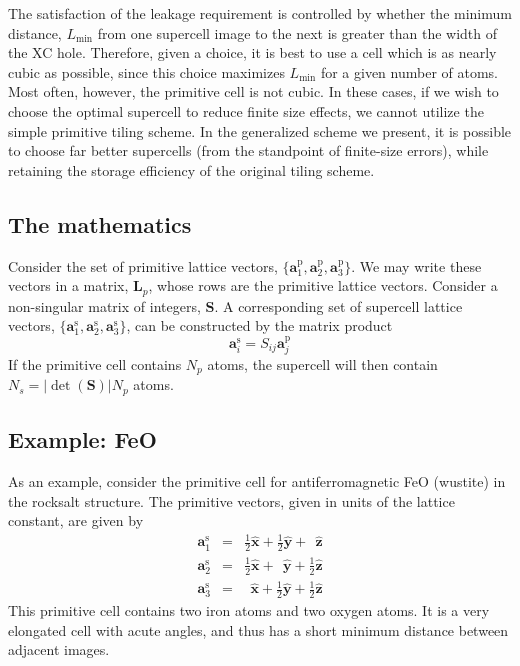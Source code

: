 The satisfaction of the leakage requirement is controlled by whether
the minimum distance, $L_{\text{min}}$ from one supercell image to the
next is greater than the width of the XC hole.  Therefore, given a
choice, it is best to use a cell which is as nearly cubic as possible,
since this choice maximizes $L_{\text{min}}$ for a given number of
atoms.  Most often, however, the primitive cell is not cubic.  In
these cases, if we wish to choose the optimal supercell to reduce
finite size effects, we cannot utilize the simple primitive tiling
scheme.  In the generalized scheme we present, it is possible to
choose far better supercells (from the standpoint of finite-size
errors), while retaining the storage efficiency of the original tiling
scheme.

\subsection{The mathematics}
\renewcommand{\vp}{\mathbf{a}^{\text{p}}}
\renewcommand{\vs}{\mathbf{a}^{\text{s}}} 
\renewcommand{\Smat}{\mathbf{S}}
Consider the set of primitive lattice vectors, $\{\vp_1, \vp_2,
\vp_3\}$.  We may write these vectors in a matrix, $\mathbf{L}_p$, whose
rows are the primitive lattice vectors.  Consider a non-singular
matrix of integers, $\Smat$.  A corresponding set of supercell lattice
vectors, $\{\vs_1, \vs_2, \vs_3\}$, can be constructed by the matrix
product 
\begin{equation}
\vs_i = S_{ij} \vp_j
\end{equation}
If the primitive cell contains $N_p$ atoms, the supercell will then
contain $N_s = |\det(\Smat)| N_p$ atoms.

\subsection{Example: FeO}
As an example, consider the primitive cell for antiferromagnetic FeO
(wustite) in the rocksalt structure.  The primitive vectors, given in
units of the lattice constant, are given by
\newcommand{\xv}{\hat{\mathbf{x}}} 
\newcommand{\yv}{\hat{\mathbf{y}}}
\newcommand{\zv}{\hat{\mathbf{z}}}
\begin{eqnarray}
\vs_1 & = & \frac{1}{2}\xv + \frac{1}{2}\yv +      \ \   \zv \\
\vs_2 & = & \frac{1}{2}\xv +      \ \   \yv + \frac{1}{2}\zv \\
\vs_3 & = &   \ \      \xv + \frac{1}{2}\yv + \frac{1}{2}\zv 
\end{eqnarray}
This primitive cell contains two iron atoms and two oxygen atoms. It
is a very elongated cell with acute angles, and thus has a short
minimum distance between adjacent images.

